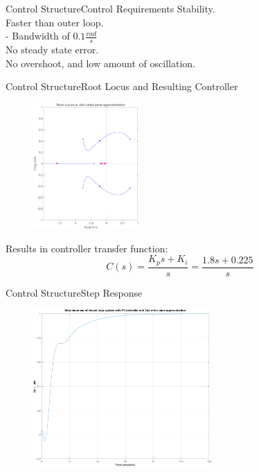 \begin{frame}{Control Structure}{Control Requirements}
	Stability.\\
	Faster than outer loop.\\
	\hspace{0.3cm} - Bandwidth of $0.1 \frac{rad}{s}$ \\
	No steady state error.\\
	No overshoot, and low amount of oscillation.\\
\end{frame}

\begin{frame}{Control Structure}{Root Locus and Resulting Controller}
	\begin{figure}[h]
		\centering
		\includegraphics[height=4.8cm,width=0.48\linewidth]{Topics/ControlStructure/Graphics/RootLocus_Pade2.png}
		\label{fig:RootLocus}
	\end{figure}
	Results in controller transfer function:
	\begin{equation}\label{eq:PIDTransferFunction}
		C(s) = \frac{K_ps+K_i}{s} = \frac{1.8s+0.225}{s}
	\end{equation}
\end{frame}


\begin{frame}{Control Structure}{Step Response}
	\begin{figure}[h]
		\centering
		\includegraphics[height=6cm,width=0.6\linewidth]{Topics/ControlStructure/Graphics/StepResponse_Pade2.png}
		\label{fig:StepResponse_Pade2.png}
	\end{figure}

\end{frame}
